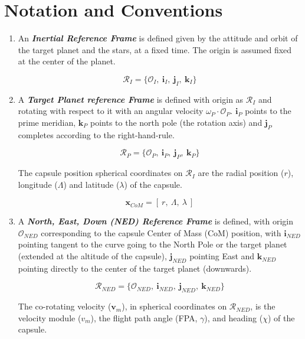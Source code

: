 \newpage
\chapter{Notation and Conventions}

   \begin{enumerate}
      \item An \textbf{\textit{Inertial Reference Frame}} is defined given by the attitude and orbit of the target planet
         and the stars, at a fixed time.
         The origin is assumed fixed at the center of the planet.

         $$\mathcal{R}_{I}=\{ \mathcal{O}_{I},\: \textbf{i}_{I},\:\textbf{j}_I,\: \textbf{k}_I \}$$

      \item A \textbf{\textit{Target Planet reference Frame}} is defined with 
         origin as $\mathcal{R}_{I}$ and rotating with respect to it with an angular
         velocity $\omega_{P}\cdot \mathcal{O}_{P}$.
         $\textbf{i}_{P}$ points to the prime meridian, $\textbf{k}_{P}$ points to the
         north pole (the rotation axis) and $\textbf{j}_{P}$ completes according
         to the right-hand-rule.

         $$\mathcal{R}_{P}=\{ \mathcal{O}_{P},\: \textbf{i}_{P},\:\textbf{j}_P,\: \textbf{k}_P \}$$

         The capsule position spherical coordinates on $\mathcal{R}_{I}$ are the radial position
         ($r$), longitude ($\Lambda$) and latitude ($\lambda$) of the capsule.
      
         $$
            \textbf{x}_{CoM} = [\: r,\:\Lambda,\:\lambda \:]
         $$

      \item A \textbf{\textit{North, East, Down (NED) Reference Frame}} is defined, with origin $\mathcal{O}_{NED}$
         corresponding to the capsule Center of Mass (CoM) position, with $\textbf{i}_{NED}$
         pointing tangent to the curve going to the North Pole or the target planet (extended at
         the altitude of the capsule), $\textbf{j}_{NED}$ pointing East and $\textbf{k}_{NED}$
         pointing directly to the center of the target planet (downwards).

         $$\mathcal{R}_{NED}=\{ \mathcal{O}_{NED},\: \textbf{i}_{NED},\:\textbf{j}_{NED},\: \textbf{k}_{NED} \}$$

         The co-rotating velocity ($\textbf{v}_{m}$), in spherical coordinates on $\mathcal{R}_{NED}$, is the velocity module ($v_{m}$), 
         the flight path angle (FPA, $\gamma$), and heading ($\chi$) of the capsule.
      

\end{enumerate}
